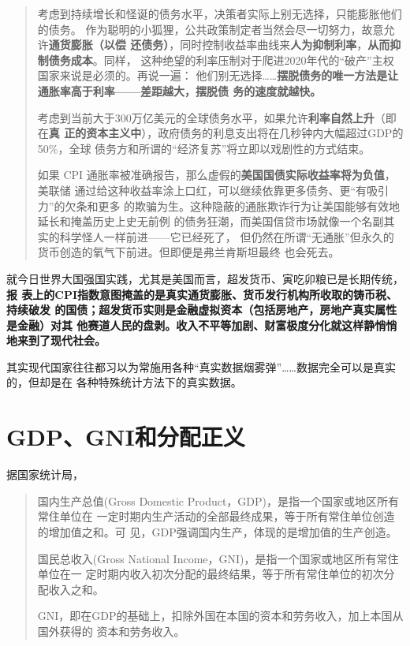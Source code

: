 \begin{quotation}
  考虑到持续增长和怪诞的债务水平，决策者实际上别无选择，只能膨胀他们的债务。
  作为聪明的小狐狸，公共政策制定者当然会尽一切努力，故意允许\textbf{通货膨胀（以偿
    还债务）}，同时控制收益率曲线来\textbf{人为抑制利率}，\textbf{从而抑制债务成本}。同样，
  这种绝望的利率压制对于爬进2020年代的“破产”主权国家来说是必须的。再说一遍：
  他们别无选择……\textbf{摆脱债务的唯一方法是让通胀率高于利率——差距越大，摆脱债
    务的速度就越快。}

  考虑到当前大于300万亿美元的全球债务水平，如果允许\textbf{利率自然上升}（即在\textbf{真
    正的资本主义中}），政府债务的利息支出将在几秒钟内大幅超过GDP的50\%，全球
  债务方和所谓的“经济复苏”将立即以戏剧性的方式结束。

  如果 CPI 通胀率被准确报告，那么虚假的\textbf{美国国债实际收益率将为负值}，美联储
  通过给这种收益率涂上口红，可以继续依靠更多债务、更“有吸引力”的欠条和更多
  的欺骗为生。这种隐蔽的通胀欺诈行为让美国能够有效地延长和掩盖历史上史无前例
  的债务狂潮，而美国信贷市场就像一个名副其实的科学怪人一样前进——它已经死了，
  但仍然在所谓“无通胀”但永久的货币创造的氧气下前进。但即便是弗兰肯斯坦最终
  也会死去。
\end{quotation}

就今日世界大国强国实践，尤其是美国而言，超发货币、寅吃卯粮已是长期传统，\textbf{报
  表上的CPI指数意图掩盖的是真实通货膨胀、货币发行机构所收取的铸币税、持续破发
  的国债；超发货币实则是金融虚拟资本（包括房地产，房地产真实属性是金融）对其
  他赛道人民的盘剥。收入不平等加剧、财富极度分化就这样静悄悄地来到了现代社会。}

其实现代国家往往都习以为常施用各种“真实数据烟雾弹”……数据完全可以是真实的，但却是在
各种特殊统计方法下的真实数据。


\section{GDP、GNI和分配正义}
\label{sec:gdp}

据国家统计局，

\begin{quotation}
  国内生产总值(Gross Domestic Product，GDP)，是指一个国家或地区所有常住单位在
  一定时期内生产活动的全部最终成果，等于所有常住单位创造的增加值之和。可
  见，GDP强调国内生产，体现的是增加值的生产创造。


  国民总收入(Gross National Income，GNI)，是指一个国家或地区所有常住单位在一
  定时期内收入初次分配的最终结果，等于所有常住单位的初次分配收入之和。

  GNI，即在GDP的基础上，扣除外国在本国的资本和劳务收入，加上本国从国外获得的
  资本和劳务收入。
\end{quotation}

